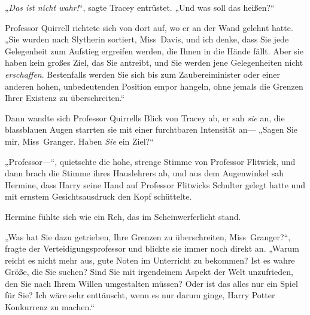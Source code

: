 „\emph{Das ist nicht wahr!}“, sagte Tracey entrüstet.
„Und was soll das heißen?“

Professor Quirrell richtete sich von dort auf, wo er an der Wand gelehnt hatte.
„Sie wurden nach Slytherin sortiert, Miss~Davis, und ich denke, dass Sie jede Gelegenheit zum Aufstieg ergreifen werden, die Ihnen in die Hände fällt. Aber sie haben kein großes Ziel, das Sie antreibt, und Sie werden jene Gelegenheiten nicht \emph{erschaffen}. Bestenfalls werden Sie sich bis zum Zaubereiminister oder einer anderen hohen, unbedeutenden Position empor hangeln, ohne jemals die Grenzen Ihrer Existenz zu überschreiten.“

Dann wandte sich Professor Quirrells Blick von Tracey ab, er sah \emph{sie} an, die blassblauen Augen starrten sie mit einer furchtbaren Intensität an—
„Sagen Sie mir, Miss~Granger. Haben \emph{Sie} ein Ziel?“

„Professor—“, quietschte die hohe, strenge Stimme von Professor Flitwick, und dann brach die Stimme ihres Hauslehrers ab, und aus dem Augenwinkel sah Hermine, dass Harry seine Hand auf Professor Flitwicks Schulter gelegt hatte und mit ernstem Gesichtsausdruck den Kopf schüttelte.

Hermine fühlte sich wie ein Reh, das im Scheinwerferlicht stand.

„Was hat Sie dazu getrieben, Ihre Grenzen zu überschreiten, Miss~Granger?“, fragte der Verteidigungsprofessor und blickte sie immer noch direkt an.
„Warum reicht es nicht mehr aus, gute Noten im Unterricht zu bekommen? Ist es wahre Größe, die Sie suchen? Sind Sie mit irgendeinem Aspekt der Welt unzufrieden, den Sie nach Ihrem Willen umgestalten müssen? Oder ist das alles nur ein Spiel für Sie? Ich wäre sehr enttäuscht, wenn es nur darum ginge, Harry Potter Konkurrenz zu machen.“

